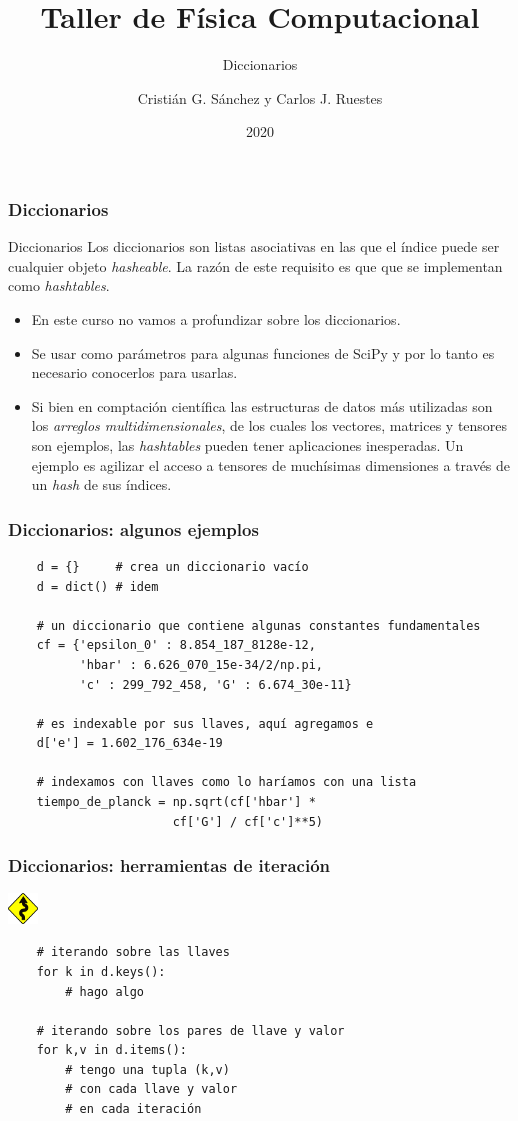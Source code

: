 \documentclass{beamer}
\title{Taller de Física Computacional}
\subtitle{Diccionarios}
\author{Cristián G. Sánchez y Carlos J. Ruestes}
\date{2020}
\begin{document}
\frame{\titlepage}

\begin{frame}[fragile]
    \frametitle{Diccionarios}
    \begin{block}{Diccionarios}
        Los diccionarios son listas asociativas en las que el índice puede ser cualquier objeto {\em hasheable}.
        La razón de este requisito es que que se implementan como {\em hashtables}. 
        \begin{itemize}
        \item En este curso no vamos a profundizar sobre los diccionarios.
        \item Se usar como parámetros para algunas funciones de SciPy y por lo tanto es necesario conocerlos para usarlas.
        \item Si bien en comptación científica las estructuras de datos más utilizadas son los {\em arreglos multidimensionales}, de los cuales los vectores, matrices y tensores son ejemplos,
        las {\em hashtables} pueden tener aplicaciones inesperadas. Un ejemplo es agilizar el acceso a tensores de muchísimas dimensiones a través de un {\em hash} de sus índices.
        \end{itemize}
    \end{block}
    \end{frame}

\begin{frame}[fragile]
    \frametitle{Diccionarios: algunos ejemplos}
    \begin{verbatim}
    d = {}     # crea un diccionario vacío
    d = dict() # idem

    # un diccionario que contiene algunas constantes fundamentales
    cf = {'epsilon_0' : 8.854_187_8128e-12, 
          'hbar' : 6.626_070_15e-34/2/np.pi,
          'c' : 299_792_458, 'G' : 6.674_30e-11}

    # es indexable por sus llaves, aquí agregamos e
    d['e'] = 1.602_176_634e-19

    # indexamos con llaves como lo haríamos con una lista
    tiempo_de_planck = np.sqrt(cf['hbar'] *
                       cf['G'] / cf['c']**5) 
    \end{verbatim}
    \end{frame}

\begin{frame}[fragile]
    \frametitle{Diccionarios: herramientas de iteración}
    \includegraphics[height=0.8cm, width=0.8cm]{figuras/sin.png}
    \begin{verbatim}
    # iterando sobre las llaves
    for k in d.keys():
        # hago algo 

    # iterando sobre los pares de llave y valor
    for k,v in d.items():
        # tengo una tupla (k,v)
        # con cada llave y valor 
        # en cada iteración
    \end{verbatim}
    \end{frame}
\end{document}
